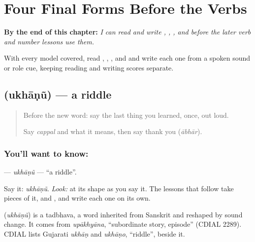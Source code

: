 
\chapter{Four Final Forms Before the Verbs}
\label{ch:gu-final-script-closure-a}

\begin{chapteropening}
\textbf{By the end of this chapter:} \emph{I can read and write , , , and  before the later verb and number lessons use them.}

With every model covered, read , , , and  and write each one from a spoken sound or role cue, keeping reading and writing scores separate.
\end{chapteropening}

\section[\texorpdfstring{\gu{ઉખાણું} (ukhāṇũ)}{ઉખાણું (ukhāṇũ)}]{ (ukhāṇũ) — a riddle}

\label{lesson:GU-C06-ukhaanun}



\begin{quote}
Before the new word: say the last thing you learned, once, out loud.

Say \emph{cappal} and what it means, then say thank you (\emph{ābhār}).
\end{quote}

\subsection*{You'll want to know: }
\textbf{} — \emph{ukhāṇũ} — \textquotedblleft{}a riddle\textquotedblright{}.

Say it: \emph{ukhāṇũ}. \emph{Look:} at its shape as you say it. The lessons that follow take pieces of it, \textbf{} and \textbf{}, and write each one on its own.

\begin{cousinweb}
\textbf{} (\emph{ukhāṇũ}) is a tadbhava, a word inherited from Sanskrit and reshaped by sound change. It comes from \emph{upākhyāna}, \textquotedblleft{}subordinate story, episode\textquotedblright{} (CDIAL 2289). CDIAL lists Gujarati \emph{ukhāṇ} and \emph{ukhāṇo}, \textquotedblleft{}riddle\textquotedblright{}, beside it.
\end{cousinweb}

